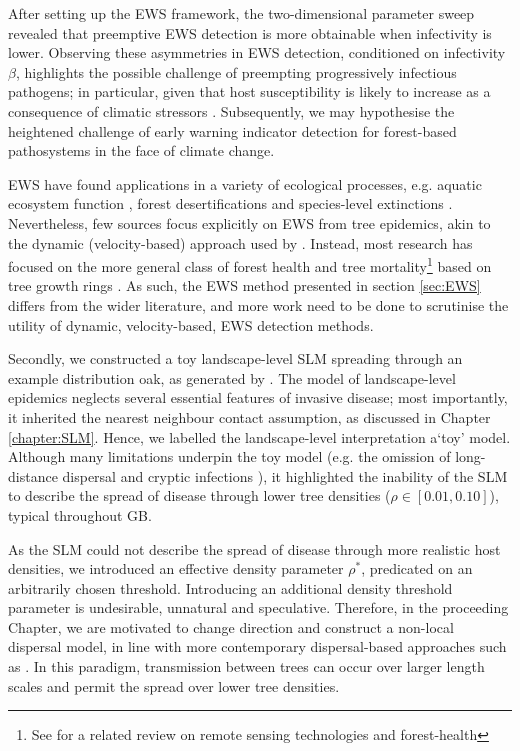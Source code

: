 After setting up the EWS framework, the two-dimensional parameter sweep revealed that preemptive EWS detection is more obtainable 
when infectivity is lower. Observing these asymmetries in EWS detection, conditioned on infectivity
$\beta$, highlights the possible challenge of preempting progressively infectious pathogens;
in particular, given that host susceptibility is likely to increase as a consequence of climatic stressors \cite{garrett2006climate}.
Subsequently, we may hypothesise the heightened challenge of early warning indicator detection for forest-based pathosystems in the face of climate change.

EWS have found applications in a variety of ecological processes, 
e.g. aquatic ecosystem function \cite{kramer1991aquatic}, forest desertifications \cite{yang2005desertification}
and species-level extinctions \cite{drake2010early}.
Nevertheless, few sources focus explicitly on EWS from tree epidemics, akin to the dynamic (velocity-based) 
approach used by \cite{OROZCOFUENTES201912}. Instead, most research has focused on the more general class of forest
health and tree mortality\footnote{ 
See \cite{torres2021role} for a related review on remote sensing technologies and forest-health
} based on tree growth rings \cite{rogers2018detecting, mamet2015tree}. 
As such, the EWS method presented in section \ref{sec:EWS} differs from the wider literature,
and more work need to be done to scrutinise the utility of dynamic, velocity-based, EWS detection methods.

Secondly, we constructed a toy landscape-level SLM spreading through an example distribution oak, as generated by \cite{hill.data}.
The model of landscape-level epidemics neglects several essential features of invasive disease; most importantly, 
it inherited the nearest neighbour contact assumption, as discussed in Chapter \ref{chapter:SLM}.
Hence, we labelled the landscape-level interpretation a`toy' model.
Although many limitations underpin the toy model (e.g. the omission of long-distance dispersal \cite{long-range-dispersal}
and cryptic infections \cite{gilligan2007impact}), it highlighted the inability of the SLM to describe the spread of disease
through lower tree densities ($\rho \in [0.01, 0.10]$), typical throughout GB.

As the SLM could not describe the spread of disease through more realistic host densities, 
we introduced an effective density parameter $\rho^*$, predicated on an arbitrarily chosen threshold.
Introducing an additional density threshold parameter is undesirable, unnatural and speculative.
Therefore, in the proceeding Chapter, we are motivated to change direction and construct a non-local
dispersal model, in line with more contemporary dispersal-based approaches such as \cite{parnell2009optimal, meentemeyer2011epidemiological}.
In this paradigm, transmission between trees can occur over larger length scales and permit the spread over lower tree densities. 

